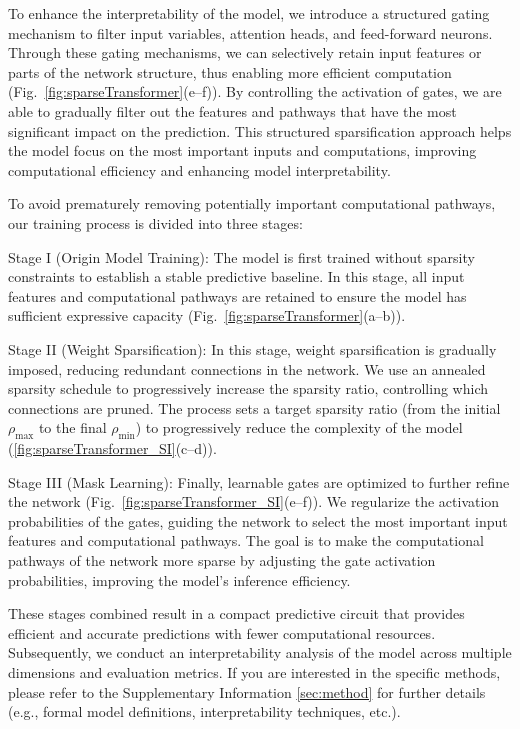 To enhance the interpretability of the model, we introduce a structured gating mechanism to filter input variables, attention heads, and feed-forward neurons\cite{louizos2018learningsparseneuralnetworks}. Through these gating mechanisms, we can selectively retain input features or parts of the network structure, thus enabling more efficient computation (Fig.~\ref{fig:sparseTransformer}(e--f)). By controlling the activation of gates, we are able to gradually filter out the features and pathways that have the most significant impact on the prediction. This structured sparsification approach helps the model focus on the most important inputs and computations, improving computational efficiency and enhancing model interpretability\cite{TFT}.

To avoid prematurely removing potentially important computational pathways, our training process is divided into three stages\cite{NIPS2015_three_step_pruning}:

Stage I (Origin Model Training): The model is first trained without sparsity constraints to establish a stable predictive baseline. In this stage, all input features and computational pathways are retained to ensure the model has sufficient expressive capacity (Fig.~\ref{fig:sparseTransformer}(a--b)).

Stage II (Weight Sparsification): In this stage, weight sparsification is gradually imposed, reducing redundant connections in the network. We use an annealed sparsity schedule to progressively increase the sparsity ratio, controlling which connections are pruned\cite{zhu2017prunepruneexploringefficacy}. The process sets a target sparsity ratio (from the initial $\rho_{\max}$ to the final $\rho_{\min}$) to progressively reduce the complexity of the model (\ref{fig:sparseTransformer_SI}(c--d)).

Stage III (Mask Learning): Finally, learnable gates are optimized to further refine the network (Fig.~\ref{fig:sparseTransformer_SI}(e--f)). We regularize the activation probabilities of the gates, guiding the network to select the most important input features and computational pathways\cite{NEURIPS2019_1113d7a7}. The goal is to make the computational pathways of the network more sparse by adjusting the gate activation probabilities, improving the model's inference efficiency.

These stages combined result in a compact predictive circuit that provides efficient and accurate predictions with fewer computational resources\cite{openai_weight_sparse_transformers}. Subsequently, we conduct an interpretability analysis of the model across multiple dimensions and evaluation metrics. If you are interested in the specific methods, please refer to the Supplementary Information \ref{sec:method} for further details (e.g., formal model definitions, interpretability techniques, etc.).